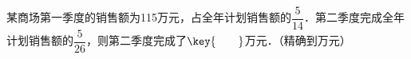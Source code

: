 某商场第一季度的销售额为115万元，占全年计划销售额的$\dfrac{5}{14}$．第二季度完成全年计划销售额的$\dfrac{5}{26}$，则第二季度完成了$\key{\qquad}$万元．（精确到万元）